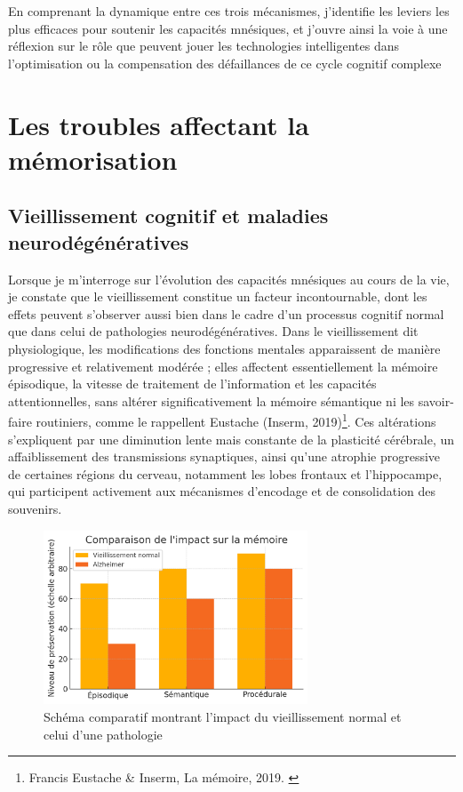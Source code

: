 \documentclass[11pt,a4paper]{report}
\begin{document}
En comprenant la dynamique entre ces trois mécanismes, j’identifie les leviers les plus efficaces pour soutenir les capacités mnésiques, et j’ouvre ainsi la voie à une réflexion sur le rôle que peuvent jouer les technologies intelligentes dans l’optimisation ou la compensation des défaillances de ce cycle cognitif complexe

\section{Les troubles affectant la mémorisation}

\subsection{Vieillissement cognitif et maladies neurodégénératives}

Lorsque je m’interroge sur l’évolution des capacités mnésiques au cours de la vie, je constate que le vieillissement constitue un facteur incontournable, dont les effets peuvent s’observer aussi bien dans le cadre d’un processus cognitif normal que dans celui de pathologies neurodégénératives. Dans le vieillissement dit physiologique, les modifications des fonctions mentales apparaissent de manière progressive et relativement modérée ; elles affectent essentiellement la mémoire épisodique, la vitesse de traitement de l’information et les capacités attentionnelles, sans altérer significativement la mémoire sémantique ni les savoir-faire routiniers, comme le rappellent Eustache (Inserm, 2019)\footnote{Francis Eustache \& Inserm, La mémoire, 2019.  \cite{inserm}}. Ces altérations s’expliquent par une diminution lente mais constante de la plasticité cérébrale, un affaiblissement des transmissions synaptiques, ainsi qu’une atrophie progressive de certaines régions du cerveau, notamment les lobes frontaux et l’hippocampe, qui participent activement aux mécanismes d’encodage et de consolidation des souvenirs.

\begin{figure}[h]
    \centering
    \includegraphics[width=0.7\textwidth]{images/1.2.1.png}
    \caption{Schéma comparatif montrant l’impact du vieillissement normal et celui d’une pathologie}
    \label{fig:1.2.1}
\end{figure}
\end{document}
